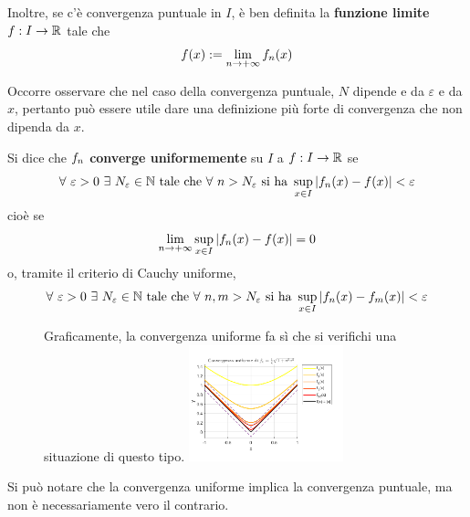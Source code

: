 \begin{definition} \label{Def: Funzione limite}
    Inoltre, se c'è convergenza puntuale in $I$, è ben definita la \textbf{funzione limite} $f: I \to \mathbb{R}$ tale che
    \begin{equation}
        f(x) := \lim_{n \to +\infty} f_n(x)
    \end{equation}
\end{definition}
Occorre osservare che nel caso della convergenza puntuale, $N$ dipende e da $\varepsilon$ e da $x$, pertanto può essere utile dare una definizione più forte di convergenza che non dipenda da $x$.
\begin{definition} \label{Def: Convergenza uniforme succ}
    Si dice che $f_n$ \textbf{converge uniformemente} su $I$ a $f: I \to \mathbb{R}$ se
    \begin{equation}
        \forall\ \varepsilon>0\ \exists\ N_\varepsilon \in \N\ \text{tale che}\ \forall\ n>N_\varepsilon\ \text{si ha}\ \sup_{x \in I}|\fn(x)-f(x)| < \varepsilon
    \end{equation}
    cioè se
    \begin{equation}
    \lim_{n \to + \infty}{\sup_{x \in I} \left| f_n(x)-f(x)\right|}=0
    \end{equation}
    o, tramite il criterio di Cauchy uniforme,
    \begin{equation}
        \forall \ \varepsilon >0 \ \exists\ N_\varepsilon \in \N \ \text{tale che}\ \forall\ n,m > N_\varepsilon\ \text{si ha}\ \sup_{x \in I}{|\fn(x)-f_m(x)|}<\varepsilon
    \end{equation}
\end{definition}
\begin{figure}[H]
    Graficamente, la convergenza uniforme fa sì che si verifichi una situazione di questo tipo.
    \centering
        \includegraphics[width=0.4\textwidth]{Capitoli/Capitolo7/Convergenza uniforme.png}
\end{figure}
\begin{oss}
   Si può notare che la convergenza uniforme implica la convergenza puntuale, ma non è necessariamente vero il contrario.
    \end{oss}
